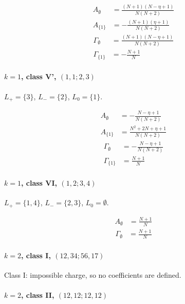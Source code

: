 \documentclass[11pt]{article}
\begin{document}
\begin{align*}
  A_{\emptyset} &= \frac{\left(N + 1\right) \left(N - \eta + 1\right)}{N \left(N + 2\right)} \\
  A_{\{1\}} &= - \frac{\left(N + 1\right) \left(\eta + 1\right)}{N \left(N + 2\right)} 
\end{align*}
\begin{align*}
  \Gamma_{\emptyset} &= \frac{\left(N + 1\right) \left(N - \eta + 1\right)}{N \left(N + 2\right)} \\
  \Gamma_{\{1\}} &= - \frac{N + 1}{N} 
\end{align*}

\paragraph{$k=1$, class V', $(1,1;2,3)$}

$L_+=\{3\}$, $L_-=\{2\}$, $L_0=\{1\}$.

\begin{align*}
  A_{\emptyset} &= - \frac{N - \eta + 1}{N \left(N + 2\right)} \\
  A_{\{1\}} &= \frac{N^{2} + 2 N + \eta + 1}{N \left(N + 2\right)} 
\end{align*}
\begin{align*}
  \Gamma_{\emptyset} &= - \frac{N - \eta + 1}{N \left(N + 2\right)} \\
  \Gamma_{\{1\}} &= \frac{N + 1}{N} 
\end{align*}

\paragraph{$k=1$, class VI, $(1,2;3,4)$}

$L_+=\{1,4\}$, $L_-=\{2,3\}$, $L_0=\emptyset$.

\begin{align*}
  A_{\emptyset} &= \frac{N + 1}{N} 
\end{align*}
\begin{align*}
  \Gamma_{\emptyset} &= \frac{N + 1}{N} 
\end{align*}

\paragraph{$k=2$, class I, $(12,34;56,17)$}
Class I: impossible charge, so no coefficients are defined.


\paragraph{$k=2$, class II, $(12,12;12,12)$}
\end{document}
